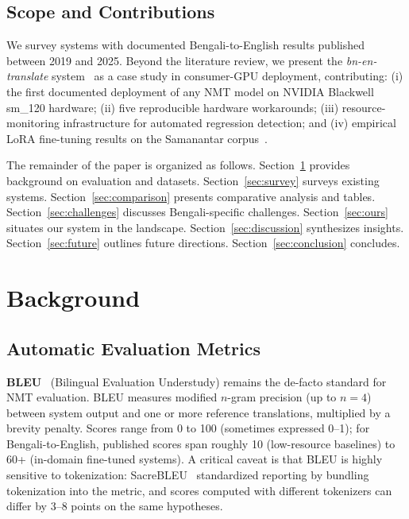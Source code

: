 \documentclass[conference]{IEEEtran}
\begin{document}
\subsection{Scope and Contributions}

We survey systems with documented Bengali-to-English results published
between 2019 and 2025.
Beyond the literature review, we present the \textit{bn-en-translate}
system~\cite{biswas2025bnentr} as a case study in consumer-GPU deployment,
contributing: (i) the first documented deployment of any NMT model on
NVIDIA Blackwell sm\_120 hardware; (ii) five reproducible hardware
workarounds; (iii) resource-monitoring infrastructure for automated
regression detection; and (iv) empirical LoRA fine-tuning results on the
Samanantar corpus~\cite{ramesh2022samanantar}.

The remainder of the paper is organized as follows.
Section~\ref{sec:background} provides background on evaluation and
datasets.
Section~\ref{sec:survey} surveys existing systems.
Section~\ref{sec:comparison} presents comparative analysis and tables.
Section~\ref{sec:challenges} discusses Bengali-specific challenges.
Section~\ref{sec:ours} situates our system in the landscape.
Section~\ref{sec:discussion} synthesizes insights.
Section~\ref{sec:future} outlines future directions.
Section~\ref{sec:conclusion} concludes.

\section{Background}
\label{sec:background}

\subsection{Automatic Evaluation Metrics}

\textbf{BLEU}~\cite{papineni2002bleu} (Bilingual Evaluation Understudy)
remains the de-facto standard for NMT evaluation.
BLEU measures modified $n$-gram precision (up to $n=4$) between system
output and one or more reference translations, multiplied by a brevity
penalty.
Scores range from 0 to 100 (sometimes expressed 0--1); for Bengali-to-English,
published scores span roughly 10 (low-resource baselines) to 60+ (in-domain
fine-tuned systems).
A critical caveat is that BLEU is highly sensitive to tokenization:
SacreBLEU~\cite{post2018sacrebleu} standardized reporting by bundling
tokenization into the metric, and scores computed with different
tokenizers can differ by 3--8 points on the same hypotheses.
\end{document}
